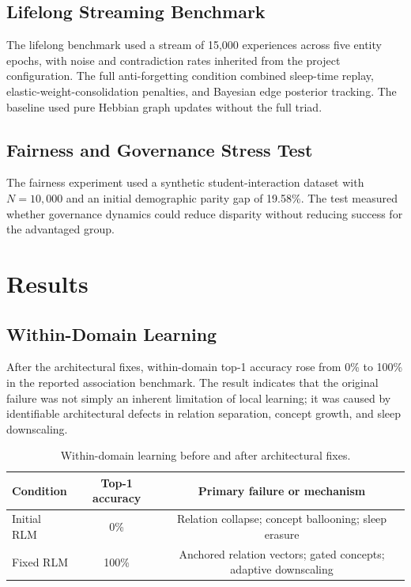 \documentclass[11pt]{article}
\begin{document}
\subsection{Lifelong Streaming Benchmark}
The lifelong benchmark used a stream of 15,000 experiences across five entity epochs, with noise and contradiction rates inherited from the project configuration. The full anti-forgetting condition combined sleep-time replay, elastic-weight-consolidation penalties, and Bayesian edge posterior tracking. The baseline used pure Hebbian graph updates without the full triad.

\subsection{Fairness and Governance Stress Test}
The fairness experiment used a synthetic student-interaction dataset with $N=10{,}000$ and an initial demographic parity gap of 19.58\%. The test measured whether governance dynamics could reduce disparity without reducing success for the advantaged group.

\section{Results}
\subsection{Within-Domain Learning}
After the architectural fixes, within-domain top-1 accuracy rose from 0\% to 100\% in the reported association benchmark. The result indicates that the original failure was not simply an inherent limitation of local learning; it was caused by identifiable architectural defects in relation separation, concept growth, and sleep downscaling.

\begin{table}[h]
\centering
\caption{Within-domain learning before and after architectural fixes.}
\begin{tabular}{lcc}
\toprule
Condition & Top-1 accuracy & Primary failure or mechanism \\
\midrule
Initial RLM & 0\% & Relation collapse; concept ballooning; sleep erasure \\
Fixed RLM & 100\% & Anchored relation vectors; gated concepts; adaptive downscaling \\
\bottomrule
\end{tabular}
\end{table}
\end{document}

